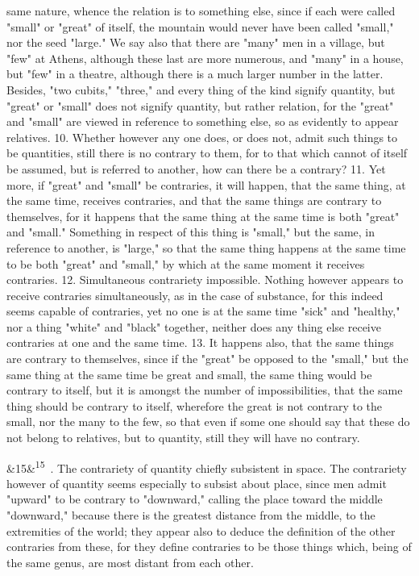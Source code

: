 \documentclass[12pt]{article}
\newcommand{\para}[1][]{\par\noindent\ifx&#1&\else\textsuperscript{\footnotesize #1}~\fi}
\begin{document}
same nature, whence the relation is to something else, since if each were called "small" or "great" of itself, the mountain would never have been called "small," nor the seed "large." We say also that there are "many" men in a village, but "few" at Athens, although these last are more numerous, and "many" in a house, but "few" in a theatre, although there is a much larger number in the latter. Besides, "two cubits," "three," and every thing of the kind signify quantity, but "great" or "small" does not signify quantity, but rather relation, for the "great" and "small" are viewed in reference to something else, so as evidently to appear relatives. 10. Whether however any one does, or does not, admit such things to be quantities, still there is no contrary to them, for to that which cannot of itself be assumed, but is referred to another, how can there be a contrary? 11. Yet more, if "great" and "small" be contraries, it will happen, that the same thing, at the same time, receives contraries, and that the same things are contrary to themselves, for it happens that the same thing at the same time is both "great" and "small." Something in respect of this thing is "small," but the same, in reference to another, is "large," so that the same thing happens at the same time to be both "great" and "small," by which at the same moment it receives contraries. 12. Simultaneous contrariety impossible. Nothing however appears to receive contraries simultaneously, as in the case of substance, for this indeed seems capable of contraries, yet no one is at the same time "sick" and "healthy," nor a thing "white" and "black" together, neither does any thing else receive contraries at one and the same time. 13. It happens also, that the same things are contrary to themselves, since if the "great" be opposed to the "small," but the same thing at the same time be great and small, the same thing would be contrary to itself, but it is amongst the number of impossibilities, that the same thing should be contrary to itself, wherefore the great is not contrary to the small, nor the many to the few, so that even if some one should say that these do not belong to relatives, but to quantity, still they will have no contrary.

\para[15] 14. The contrariety of quantity chiefly subsistent in space. The contrariety however of quantity seems especially to subsist about place, since men admit "upward" to be contrary to "downward," calling the place toward the middle "downward," because there is the greatest distance from the middle, to the extremities of the world; they appear also to deduce the definition of the other contraries from these, for they define contraries to be those things which, being of the same genus, are most distant from each other.
\end{document}
